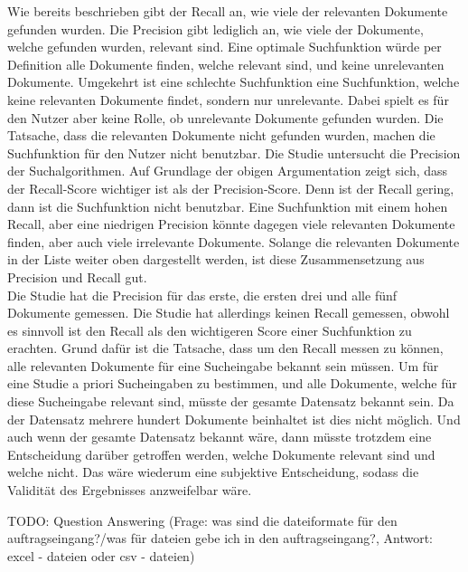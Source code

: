 Wie bereits beschrieben gibt der Recall an, wie viele der relevanten Dokumente gefunden wurden.
Die Precision gibt lediglich an, wie viele der Dokumente, welche gefunden wurden, relevant sind.
Eine optimale Suchfunktion würde per Definition alle Dokumente finden, welche relevant sind, und keine unrelevanten Dokumente.
Umgekehrt ist eine schlechte Suchfunktion eine Suchfunktion, welche keine relevanten Dokumente findet, sondern nur unrelevante.
Dabei spielt es für den Nutzer aber keine Rolle, ob unrelevante Dokumente gefunden wurden.
Die Tatsache, dass die relevanten Dokumente nicht gefunden wurden, machen die Suchfunktion für den Nutzer nicht benutzbar. 
Die Studie untersucht die Precision der Suchalgorithmen.
Auf Grundlage der obigen Argumentation zeigt sich, dass der Recall-Score wichtiger ist als der Precision-Score.
Denn ist der Recall gering, dann ist die Suchfunktion nicht benutzbar.
Eine Suchfunktion mit einem hohen Recall, aber eine niedrigen Precision könnte dagegen viele relevanten Dokumente finden, aber auch viele irrelevante Dokumente.
Solange die relevanten Dokumente in der Liste weiter oben dargestellt werden, ist diese Zusammensetzung aus Precision und Recall gut.\\

Die Studie hat die Precision für das erste, die ersten drei und alle fünf Dokumente gemessen.
Die Studie hat allerdings keinen Recall gemessen, obwohl es sinnvoll ist den Recall als den wichtigeren Score einer Suchfunktion zu erachten.
Grund dafür ist die Tatsache, dass um den Recall messen zu können, alle relevanten Dokumente für eine Sucheingabe bekannt sein müssen.
Um für eine Studie a priori Sucheingaben zu bestimmen, und alle Dokumente, welche für diese Sucheingabe relevant sind, müsste der gesamte Datensatz bekannt sein.
Da der Datensatz mehrere hundert Dokumente beinhaltet ist dies nicht möglich.
Und auch wenn der gesamte Datensatz bekannt wäre, dann müsste trotzdem eine Entscheidung darüber getroffen werden, welche Dokumente relevant sind und welche nicht.
Das wäre wiederum eine subjektive Entscheidung, sodass die Validität des Ergebnisses anzweifelbar wäre.

TODO: Question Answering (Frage: was sind die dateiformate für den auftragseingang?/was für dateien gebe ich in den auftragseingang?, Antwort: excel - dateien oder csv - dateien)